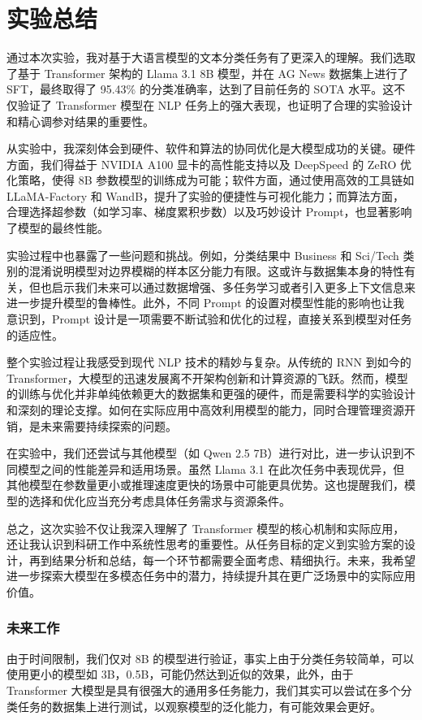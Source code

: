 \section{实验总结}

通过本次实验，我对基于大语言模型的文本分类任务有了更深入的理解。我们选取了基于 Transformer 架构的 Llama 3.1 8B 模型，并在 AG News 数据集上进行了 SFT，最终取得了 95.43\% 的分类准确率，达到了目前任务的 SOTA 水平。这不仅验证了 Transformer 模型在 NLP 任务上的强大表现，也证明了合理的实验设计和精心调参对结果的重要性。

从实验中，我深刻体会到硬件、软件和算法的协同优化是大模型成功的关键。硬件方面，我们得益于 NVIDIA A100 显卡的高性能支持以及 DeepSpeed 的 ZeRO 优化策略，使得 8B 参数模型的训练成为可能；软件方面，通过使用高效的工具链如 LLaMA-Factory 和 WandB，提升了实验的便捷性与可视化能力；而算法方面，合理选择超参数（如学习率、梯度累积步数）以及巧妙设计 Prompt，也显著影响了模型的最终性能。

实验过程中也暴露了一些问题和挑战。例如，分类结果中 Business 和 Sci/Tech 类别的混淆说明模型对边界模糊的样本区分能力有限。这或许与数据集本身的特性有关，但也启示我们未来可以通过数据增强、多任务学习或者引入更多上下文信息来进一步提升模型的鲁棒性。此外，不同 Prompt 的设置对模型性能的影响也让我意识到，Prompt 设计是一项需要不断试验和优化的过程，直接关系到模型对任务的适应性。

整个实验过程让我感受到现代 NLP 技术的精妙与复杂。从传统的 RNN 到如今的 Transformer，大模型的迅速发展离不开架构创新和计算资源的飞跃。然而，模型的训练与优化并非单纯依赖更大的数据集和更强的硬件，而是需要科学的实验设计和深刻的理论支撑。如何在实际应用中高效利用模型的能力，同时合理管理资源开销，是未来需要持续探索的问题。

在实验中，我们还尝试与其他模型（如 Qwen 2.5 7B）进行对比，进一步认识到不同模型之间的性能差异和适用场景。虽然 Llama 3.1 在此次任务中表现优异，但其他模型在参数量更小或推理速度更快的场景中可能更具优势。这也提醒我们，模型的选择和优化应当充分考虑具体任务需求与资源条件。

总之，这次实验不仅让我深入理解了 Transformer 模型的核心机制和实际应用，还让我认识到科研工作中系统性思考的重要性。从任务目标的定义到实验方案的设计，再到结果分析和总结，每一个环节都需要全面考虑、精细执行。未来，我希望进一步探索大模型在多模态任务中的潜力，持续提升其在更广泛场景中的实际应用价值。

\subsubsection{未来工作}

由于时间限制，我们仅对 8B 的模型进行验证，事实上由于分类任务较简单，可以使用更小的模型如 3B，0.5B，可能仍然达到近似的效果，此外，由于 Transformer 大模型是具有很强大的通用多任务能力，我们其实可以尝试在多个分类任务的数据集上进行测试，以观察模型的泛化能力，有可能效果会更好。